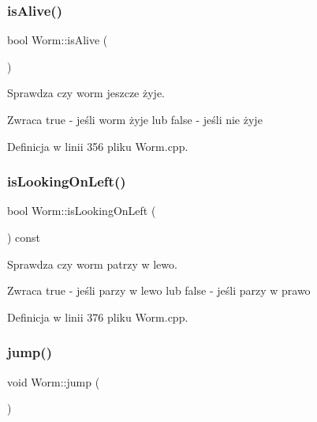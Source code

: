 \subsubsection{\texorpdfstring{is\+Alive()}{isAlive()}}
{\footnotesize\ttfamily bool Worm\+::is\+Alive (\begin{DoxyParamCaption}{ }\end{DoxyParamCaption})}



Sprawdza czy worm jeszcze żyje. 

\begin{DoxyReturn}{Zwraca}
true -\/ jeśli worm żyje lub false -\/ jeśli nie żyje 
\end{DoxyReturn}


Definicja w linii 356 pliku Worm.\+cpp.

\mbox{\label{class_worm_a3a90a91ddbe99e67f48e54a57d12b5c7}} 
\subsubsection{\texorpdfstring{is\+Looking\+On\+Left()}{isLookingOnLeft()}}
{\footnotesize\ttfamily bool Worm\+::is\+Looking\+On\+Left (\begin{DoxyParamCaption}{ }\end{DoxyParamCaption}) const}



Sprawdza czy worm patrzy w lewo. 

\begin{DoxyReturn}{Zwraca}
true -\/ jeśli parzy w lewo lub false -\/ jeśli parzy w prawo 
\end{DoxyReturn}


Definicja w linii 376 pliku Worm.\+cpp.

\mbox{\label{class_worm_ae4cd763e0edd18cecab42b39142cea14}} 
\subsubsection{\texorpdfstring{jump()}{jump()}}
{\footnotesize\ttfamily void Worm\+::jump (\begin{DoxyParamCaption}{ }\end{DoxyParamCaption})}



